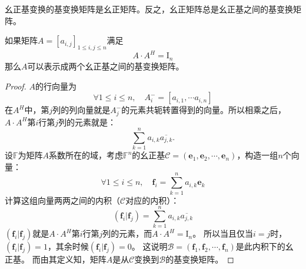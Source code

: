 \documentclass[12pt,UTF8,fontset=none]{ctexbook}
\begin{document}
幺正基变换的基变换矩阵是幺正矩阵。反之，幺正矩阵总是幺正基之间的基变换矩阵。
\begin{pp}\label{pp:8_1}
    如果矩阵$A = [a_{i,j}]_{1\leqslant i , j \leqslant n}$满足
    $$ A \cdot A^H = \mathrm{I}_n$$
    那么$A$可以表示成两个幺正基之间的基变换矩阵。
\end{pp}
\begin{proof} %
    $A$的行向量为
    $$ \forall 1\leqslant i \leqslant n, \quad A_i^- = [a_{i,1}, \cdots a_{i,n}]$$
    在$A^H$中，第$j$列的列向量就是$A_j^-$的元素共轭转置得到的向量。所以相乘之后，$ A \cdot A^H$第$i$行第$j$列的元素就是：
    $$ \sum_{k=1}^n a_{i,k} \overline{a_{j,k}}. $$
    设$\mathbb{F}$为矩阵$A$系数所在的域，考虑$\mathbb{F}^n$的幺正基$ \mathcal{C} = (\mathbf{e}_1, \mathbf{e}_2, \cdots , \mathbf{e}_n )$，构造一组$n$个向量：
    $$ \forall 1\leqslant i \leqslant n, \quad \mathbf{f}_i = \sum_{k=1}^n a_{i,k} \mathbf{e}_k $$
    计算这组向量两两之间的内积（$ \mathcal{C} $对应的内积）：
    $$ (\mathbf{f}_i | \mathbf{f}_j ) = \sum_{k=1}^n a_{i,k} \overline{a_{j,k}} $$
    $ (\mathbf{f}_i | \mathbf{f}_j )$就是$ A \cdot A^H$第$i$行第$j$列的元素，而$ A \cdot A^H = \mathrm{I}_n$。
    所以当且仅当$i = j$时，$ (\mathbf{f}_i | \mathbf{f}_j ) = 1$，其余时候$ (\mathbf{f}_i | \mathbf{f}_j ) = 0$。
    这说明$\mathcal{B} = (\mathbf{f}_1, \mathbf{f}_2, \cdots , \mathbf{f}_n )$是此内积下的幺正基。
    而由其定义知，矩阵$A$是从$ \mathcal{C} $变换到$ \mathcal{B} $的基变换矩阵。

\end{proof}
\end{document}
